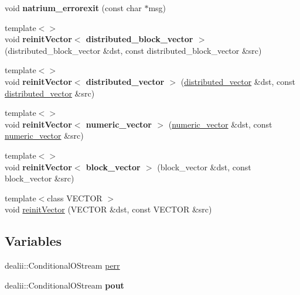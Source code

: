 \begin{DoxyCompactItemize}
\item 
\hypertarget{namespacenatrium_a4ee36100433ccf7e16ee3aa1b03a401e}{
void {\bfseries natrium\_\-errorexit} (const char $\ast$msg)}
\label{namespacenatrium_a4ee36100433ccf7e16ee3aa1b03a401e}

\item 
\hypertarget{namespacenatrium_a2a8dd72d47e91c7e67cd26ee06ea9318}{
{\footnotesize template$<$$>$ }\\void {\bfseries reinitVector$<$ distributed\_\-block\_\-vector $>$} (distributed\_\-block\_\-vector \&dst, const distributed\_\-block\_\-vector \&src)}
\label{namespacenatrium_a2a8dd72d47e91c7e67cd26ee06ea9318}

\item 
\hypertarget{namespacenatrium_a2a6a1717ec66f3598c956ee077e9aa7c}{
{\footnotesize template$<$$>$ }\\void {\bfseries reinitVector$<$ distributed\_\-vector $>$} (\hyperlink{namespacenatrium_a903d2b92917f582f2ff05f52160ab811}{distributed\_\-vector} \&dst, const \hyperlink{namespacenatrium_a903d2b92917f582f2ff05f52160ab811}{distributed\_\-vector} \&src)}
\label{namespacenatrium_a2a6a1717ec66f3598c956ee077e9aa7c}

\item 
\hypertarget{namespacenatrium_ae4f0884b841c84392ef76f5cef13b798}{
{\footnotesize template$<$$>$ }\\void {\bfseries reinitVector$<$ numeric\_\-vector $>$} (\hyperlink{namespacenatrium_a67c39077adc6634f8fa3762b8eef24c4}{numeric\_\-vector} \&dst, const \hyperlink{namespacenatrium_a67c39077adc6634f8fa3762b8eef24c4}{numeric\_\-vector} \&src)}
\label{namespacenatrium_ae4f0884b841c84392ef76f5cef13b798}

\item 
\hypertarget{namespacenatrium_a60c08462f26b0566d3676ef72a77a289}{
{\footnotesize template$<$$>$ }\\void {\bfseries reinitVector$<$ block\_\-vector $>$} (block\_\-vector \&dst, const block\_\-vector \&src)}
\label{namespacenatrium_a60c08462f26b0566d3676ef72a77a289}

\item 
{\footnotesize template$<$class VECTOR $>$ }\\void \hyperlink{namespacenatrium_a95eedd6a35d489da1b939928d8cf40e0}{reinitVector} (VECTOR \&dst, const VECTOR \&src)
\end{DoxyCompactItemize}
\subsection*{Variables}
\begin{DoxyCompactItemize}
\item 
dealii::ConditionalOStream \hyperlink{namespacenatrium_a3cedd4d2c74ed3a6e0f61166ddff40d1}{perr}
\item 
\hypertarget{namespacenatrium_ae1c1457daa96180a3ee2057cf5f7f9e3}{
dealii::ConditionalOStream {\bfseries pout}}
\label{namespacenatrium_ae1c1457daa96180a3ee2057cf5f7f9e3}

\end{DoxyCompactItemize}



